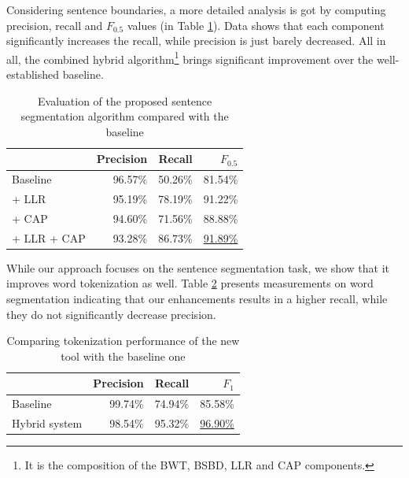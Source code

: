 Considering sentence boundaries, a more detailed analysis is got by computing precision, recall and $F_{0.5}$ values (in Table \ref{tab:prec_rec}). 
Data shows that each component significantly increases the recall, while precision is just barely decreased. 
All in all, the combined hybrid algorithm\footnote{It is the composition of the BWT, BSBD, LLR and CAP components.} brings significant improvement over the well-established baseline.

\begin{table}[H]
\centering
\caption{Evaluation of the proposed sentence segmentation algorithm compared with the baseline}
\label{tab:prec_rec}
\begin{tabular}{ l r r  r  } 
\hline
& Precision & Recall & $F_{0.5}$ \\
\hline
Baseline & 96.57\% & 50.26\% & 81.54\%  \\
+ LLR & 95.19\% & 78.19\% & 91.22\% \\
+ CAP & 94.60\% & 71.56\% & 88.88\% \\
+ LLR + CAP & 93.28\% & 86.73\% & \underline{91.89\%} \\
\hline
\end{tabular}
\end{table}


While our approach focuses on the sentence segmentation task, we show that it improves word tokenization as well. 
Table \ref{tab:tok_eval} presents measurements on word segmentation indicating that our enhancements results in a higher recall, while they do not significantly decrease precision. \label{sec:eval}


\begin{table}[h]
\centering
\caption{Comparing tokenization performance of the new tool with the baseline one}
\label{tab:tok_eval}
\begin{tabular}{ l r r r} 
\hline
& Precision & Recall & $F_{1}$ \\
\hline
Baseline & 99.74\% & 74.94\% & 85.58\%  \\
Hybrid system & 98.54\% & 95.32\% & \underline{96.90\%} \\
\hline
\end{tabular}
\end{table}

